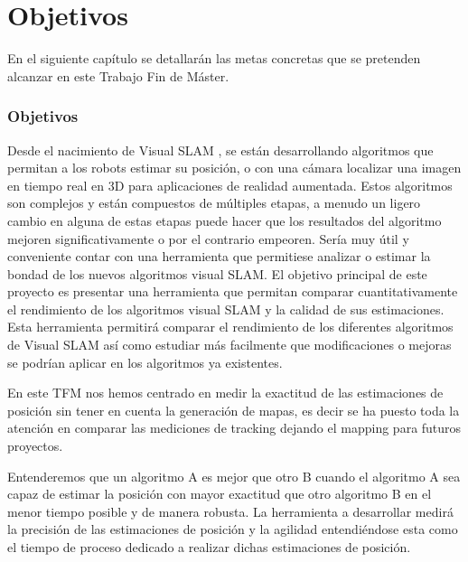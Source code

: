 \chapter{Objetivos} \label{cap:Objetivos}

\setcounter{section}{2}

En el siguiente capítulo se detallarán las metas concretas que se pretenden alcanzar en este Trabajo Fin de Máster.

\subsection{Objetivos}
Desde el nacimiento de Visual SLAM , se están desarrollando algoritmos que permitan a los robots estimar su posición, o con una cámara localizar una imagen en tiempo real en 3D para aplicaciones de realidad aumentada. Estos algoritmos son complejos y están compuestos de múltiples etapas, a menudo un ligero cambio en alguna de estas etapas puede hacer que los resultados del algoritmo mejoren significativamente o por el contrario empeoren. Sería muy útil y conveniente contar con una herramienta que permitiese analizar o estimar la bondad de los nuevos algoritmos visual SLAM. El objetivo principal de este proyecto es presentar una herramienta que permitan comparar cuantitativamente el rendimiento de los algoritmos visual SLAM y la calidad de sus estimaciones.
Esta herramienta permitirá comparar el rendimiento de los diferentes algoritmos de Visual SLAM así como estudiar más facilmente que modificaciones o mejoras se podrían aplicar en los algoritmos ya existentes.

En  este TFM nos hemos centrado en medir la exactitud de las estimaciones de posición sin tener en cuenta la generación de mapas, es decir se ha puesto toda la atención en comparar las mediciones de tracking dejando el mapping para futuros proyectos. 

Entenderemos que un algoritmo A es mejor que otro B cuando el algoritmo A sea capaz de estimar la posición con mayor exactitud que otro algoritmo B en el menor tiempo posible y de manera robusta. La herramienta a desarrollar medirá la precisión de las estimaciones de posición y la agilidad entendiéndose esta como el tiempo de proceso dedicado a realizar dichas estimaciones de posición. 

